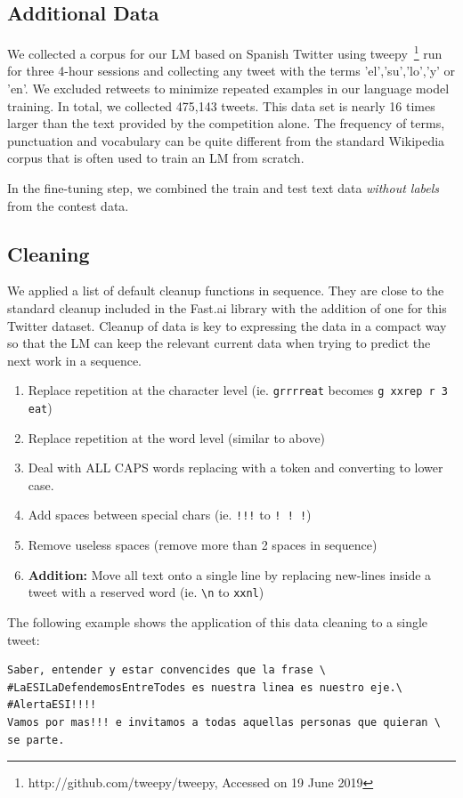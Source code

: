 \documentclass[runningheads]{llncs}
\begin{document}
\subsection{Additional Data}
We collected a corpus for our LM based on Spanish Twitter using tweepy~\footnote{http://github.com/tweepy/tweepy, Accessed on 19 June 2019} run for three 4-hour sessions and collecting any tweet with the terms 'el','su','lo','y' or 'en'. We excluded retweets to minimize repeated examples in our language model training.  In total, we collected 475,143 tweets.  This data set is nearly 16 times larger than the text provided by the competition alone.  The frequency of terms, punctuation and vocabulary can be quite different from the standard Wikipedia corpus that is often used to train an LM from scratch.  

In the fine-tuning step, we combined the train and test text data \textit{without labels} from the contest data.
\subsection{Cleaning}
We applied a list of default cleanup functions in sequence.  They are close to the standard cleanup included in the Fast.ai library with the addition of one for this Twitter dataset. Cleanup of data is key to expressing the data in a compact way so that the LM can keep the relevant current data when trying to predict the next work in a sequence.
\begin{enumerate}
	\item Replace repetition at the character level (ie. \verb|grrrreat| becomes \verb|g xxrep r 3 eat|)
	\item Replace repetition at the word level (similar to above)
	\item Deal with ALL CAPS words replacing with a token and converting to lower case.
	\item Add spaces between special chars (ie. \verb|!!!| to \verb|! ! !|)
	\item Remove useless spaces (remove more than 2 spaces in sequence)	
	\item \textbf{Addition:} Move all text onto a single line by replacing new-lines inside a tweet with a reserved word (ie. \verb|\n| to \verb|xxnl|)
\end{enumerate} 
The following example shows the application of this data cleaning to a single tweet:
\begin{verbatim} 
Saber, entender y estar convencides que la frase \
#LaESILaDefendemosEntreTodes es nuestra linea es nuestro eje.\
#AlertaESI!!!!
Vamos por mas!!! e invitamos a todas aquellas personas que quieran \
se parte.
\end{verbatim}
\end{document}
